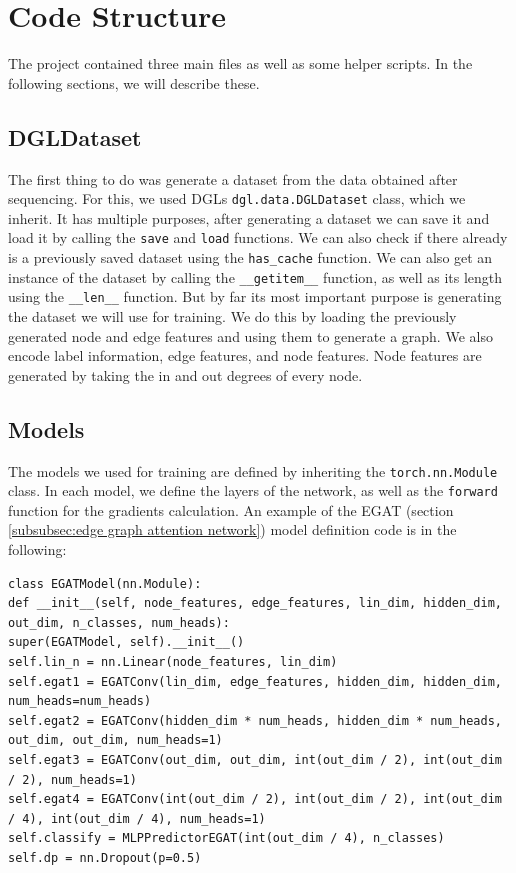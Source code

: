 \documentclass[times, utf8, diplomski, english]{fer_eng}
\begin{document}
\section{Code Structure}
\label{sec:code structure}

The project contained three main files as well as some helper scripts. In the following sections, we will describe these.

\subsection{DGLDataset}

The first thing to do was generate a dataset from the data obtained after sequencing. For this, we used DGLs \texttt{dgl.data.DGLDataset} class, which we inherit. It has multiple purposes, after generating a dataset we can save it and load it by calling the \texttt{save} and \texttt{load} functions. We can also check if there already is a previously saved dataset using the \texttt{has\_cache} function. We can also get an instance of the dataset by calling the \texttt{\_\_getitem\_\_} function, as well as its length using the \texttt{\_\_len\_\_} function. But by far its most important purpose is generating the dataset we will use for training. We do this by loading the previously generated node and edge features and using them to generate a graph. We also encode label information, edge features, and node features. Node features are generated by taking the in and out degrees of every node.

\subsection{Models}

The models we used for training are defined by inheriting the \texttt{torch.nn.Module} class. In each model, we define the layers of the network, as well as the \texttt{forward} function for the gradients calculation. An example of the EGAT (section \ref{subsubsec:edge graph attention network}) model definition code is in the following:

\begin{lstlisting}
class EGATModel(nn.Module):
def __init__(self, node_features, edge_features, lin_dim, hidden_dim, out_dim, n_classes, num_heads):
super(EGATModel, self).__init__()
self.lin_n = nn.Linear(node_features, lin_dim)
self.egat1 = EGATConv(lin_dim, edge_features, hidden_dim, hidden_dim, num_heads=num_heads)
self.egat2 = EGATConv(hidden_dim * num_heads, hidden_dim * num_heads, out_dim, out_dim, num_heads=1)
self.egat3 = EGATConv(out_dim, out_dim, int(out_dim / 2), int(out_dim / 2), num_heads=1)
self.egat4 = EGATConv(int(out_dim / 2), int(out_dim / 2), int(out_dim / 4), int(out_dim / 4), num_heads=1)
self.classify = MLPPredictorEGAT(int(out_dim / 4), n_classes)
self.dp = nn.Dropout(p=0.5)
\end{lstlisting}
\end{document}
